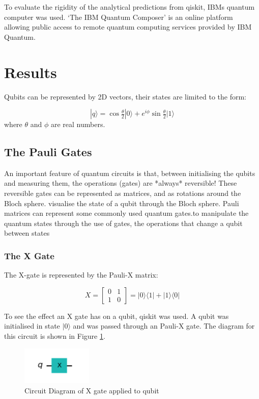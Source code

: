 To evaluate the rigidity of the analytical predictions from qiskit, IBMs quantum computer was used. `The IBM Quantum Composer' is an online platform allowing public access to remote quantum computing services provided by IBM Quantum.


\section{Results}
Qubits can be represented by 2D vectors, their states are limited to the form:

$$ |q\rangle = \cos{\tfrac{\theta}{2}}|0\rangle + e^{i\phi}\sin{\tfrac{\theta}{2}}|1\rangle $$
where $\theta$ and $\phi$ are real numbers. 

\subsection{The Pauli Gates}
An important feature of quantum circuits is that, between initialising the qubits and measuring them, the operations (gates) are *always* reversible! These reversible gates can be represented as matrices, and as rotations around the Bloch sphere. visualise the state of a qubit through the Bloch sphere.
Pauli matrices can represent some commonly used quantum gates.to manipulate the quantum states through the use of gates, the operations that change a qubit between states

\subsubsection{The X Gate}
The X-gate is represented by the Pauli-X matrix:

$$ X = \begin{bmatrix} 0 & 1 \\ 1 & 0 \end{bmatrix} = |0\rangle\langle1| + |1\rangle\langle0| $$

To see the effect an X gate has on a qubit, qiskit was used. A qubit was initialised in state $|0\rangle$ and was passed through an Pauli-X gate. The diagram for this circuit is shown in Figure \ref{fig:xGate}.

\begin{figure}[h]
    \centering
    \includegraphics[width=0.3\textwidth]{lab2/images/xGate.png}
    \caption{Circuit Diagram of X gate applied to qubit} 
    \label{fig:xGate}
\end{figure}

